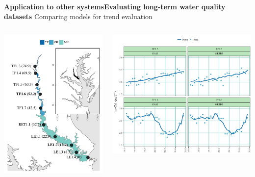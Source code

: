 \documentclass[serif]{beamer}\usepackage[]{graphicx}\usepackage[]{color}
\begin{document}
\begin{frame}{\textbf{Application to other systems}}{\textbf{Evaluating long-term water quality datasets}}
Comparing models for trend evaluation \cite{Beck17}
\begin{columns}
\begin{column}{0.38\textwidth}
\includegraphics[width = \textwidth]{fig/patux_map.pdf}
\end{column}
\begin{column}{0.65\textwidth}
\includegraphics[width = \textwidth]{fig/predann.pdf}

\end{column}
\end{columns}
\end{frame}
\end{document}

